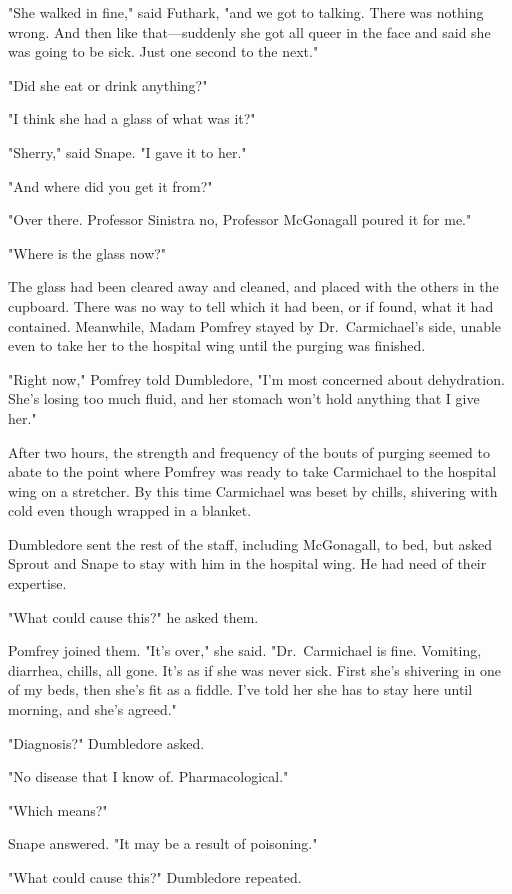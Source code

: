 "She walked in fine," said Futhark, "and we got to talking. There was nothing wrong. And then like that—suddenly she got all queer in the face and said she was going to be sick. Just one second to the next."

"Did she eat or drink anything?"

"I think she had a glass of{\el} what was it?"

"Sherry," said Snape. "I gave it to her."

"And where did you get it from?"

"Over there. Professor Sinistra{\el} no, Professor McGonagall poured it for me."

"Where is the glass now?"

The glass had been cleared away and cleaned, and placed with the others in the cupboard. There was no way to tell which it had been, or if found, what it had contained. Meanwhile, Madam Pomfrey stayed by Dr.~Carmichael's side, unable even to take her to the hospital wing until the purging was finished.

"Right now," Pomfrey told Dumbledore, "I'm most concerned about dehydration. She's losing too much fluid, and her stomach won't hold anything that I give her."

After two hours, the strength and frequency of the bouts of purging seemed to abate to the point where Pomfrey was ready to take Carmichael to the hospital wing on a stretcher. By this time Carmichael was beset by chills, shivering with cold even though wrapped in a blanket.

Dumbledore sent the rest of the staff, including McGonagall, to bed, but asked Sprout and Snape to stay with him in the hospital wing. He had need of their expertise.

"What could cause this?" he asked them.

Pomfrey joined them. "It's over," she said. "Dr.~Carmichael is fine. Vomiting, diarrhea, chills, all gone. It's as if she was never sick. First she's shivering in one of my beds, then she's fit as a fiddle. I've told her she has to stay here until morning, and she's agreed."

"Diagnosis?" Dumbledore asked.

"No disease that I know of. Pharmacological."

"Which means?"

Snape answered. "It may be a result of poisoning."

"What could cause this?" Dumbledore repeated.

